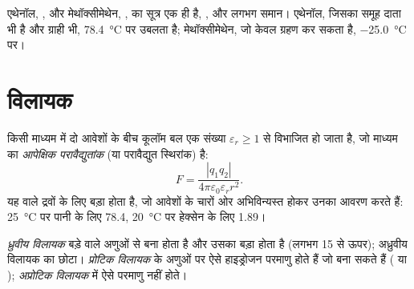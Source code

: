 \begin{example}\label{ex:b1:intermolecular-forces-solvents:isomers}
एथेनॉल, , और मेथॉक्सीमेथेन, , का सूत्र एक ही है,
, और  लगभग समान। एथेनॉल,
जिसका  समूह दाता भी है और ग्राही भी,
\qty{78.4}{\celsius} पर उबलता है; मेथॉक्सीमेथेन, जो केवल ग्रहण कर सकता है,
\qty{-25.0}{\celsius} पर।
\end{example}

\section{विलायक}

\begin{definition}[आपेक्षिक परावैद्युतांक]\label{def:b1:intermolecular-forces-solvents:permittivity}
किसी माध्यम में दो आवेशों के बीच कूलॉम बल एक संख्या
$\varepsilon_r \ge 1$ से विभाजित हो जाता है, जो माध्यम का \emph{आपेक्षिक परावैद्युतांक}
(या परावैद्युत स्थिरांक) है:
\[
  F = \frac{|q_1 q_2|}{4\pi\varepsilon_0\varepsilon_r r^2} .
\]
यह  वाले द्रवों के लिए बड़ा होता है, जो आवेशों के चारों ओर
अभिविन्यस्त होकर उनका आवरण करते हैं: \qty{25}{\celsius} पर पानी के लिए \num{78.4},
\qty{20}{\celsius} पर हेक्सेन के लिए \num{1.89}।
\end{definition}

\begin{definition}[ध्रुवीय, प्रोटिक और अप्रोटिक विलायक]\label{def:b1:intermolecular-forces-solvents:solvent-classes}
\emph{ध्रुवीय विलायक} बड़े  वाले
अणुओं से बना होता है और उसका  बड़ा होता है (लगभग
15 से ऊपर); अध्रुवीय विलायक का छोटा। \emph{प्रोटिक
विलायक} के अणुओं पर ऐसे हाइड्रोजन परमाणु होते हैं जो
 बना सकते हैं ( या ); \emph{अप्रोटिक
विलायक} में ऐसे परमाणु नहीं होते।
\end{definition}

